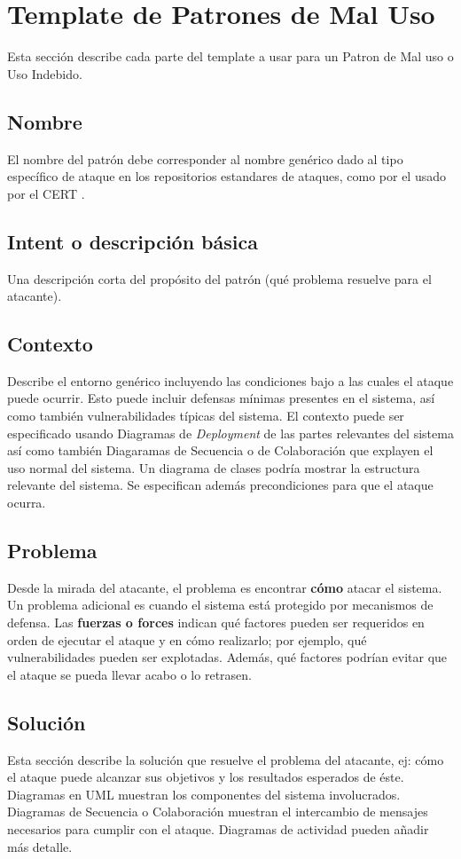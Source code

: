 \section{Template de Patrones de Mal Uso}
\label{chap5:TemplateMP}
Esta sección describe cada parte del template a usar para un Patron de Mal uso o Uso Indebido.

\subsection*{Nombre}
El nombre del patrón debe corresponder al nombre genérico dado al tipo específico de ataque en los repositorios estandares de ataques, como por el usado por el CERT \cite{cve}.

\subsection*{Intent o descripción básica}
Una descripción corta del propósito del patrón (qué problema resuelve para el atacante).

\subsection*{Contexto}
Describe el entorno genérico incluyendo las condiciones bajo a las cuales el ataque puede ocurrir. Esto puede incluir defensas mínimas presentes en el sistema, así como también vulnerabilidades típicas del sistema. El contexto puede ser especificado usando Diagramas de \textit{Deployment} de las partes relevantes del sistema así como también Diagaramas de Secuencia o de Colaboración que explayen el uso normal del sistema. Un diagrama de clases podría mostrar la estructura relevante del sistema. Se especifican además precondiciones para que el ataque ocurra.

\subsection*{Problema}
Desde la mirada del atacante, el problema es encontrar \textbf{cómo} atacar el sistema. Un problema adicional es cuando el sistema está protegido por mecanismos de defensa. Las \textbf{fuerzas o forces} indican qué factores pueden ser requeridos en orden de ejecutar el ataque y en cómo realizarlo; por ejemplo, qué vulnerabilidades pueden ser explotadas. Además, qué factores podrían evitar que el ataque se pueda llevar acabo o lo retrasen.

\subsection*{Solución}
Esta sección describe la solución que resuelve el problema del atacante, ej: cómo el ataque puede alcanzar sus objetivos y los resultados esperados de éste. Diagramas en UML muestran los componentes del sistema involucrados. Diagramas de Secuencia o Colaboración muestran el intercambio de mensajes necesarios para cumplir con el ataque. Diagramas de actividad pueden añadir más detalle.

